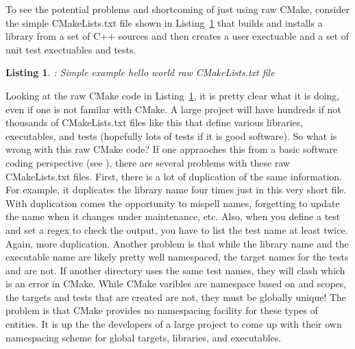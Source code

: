 \documentclass[10pt]{article}
\newtheorem{listing}{Listing}
\begin{document}
To see the potential problems and shortcoming of just using raw CMake, consider the simple CMakeLists.txt file shown in Listing~\ref{listing:RawHelloWorld} that builds and installs a library from a set of C++ sources and then creates a user exectuable and a set of unit test exectuables and tests.

\begin{listing}: Simple example hello world raw CMakeLists.txt file
\label{listing:RawHelloWorld}
{\small

}
\end{listing}

Looking at the raw CMake code in Listing~\ref{listing:RawHelloWorld}, it is pretty clear what it is doing, even if one is not familar with CMake.  A large project will have hundreds if not thousands of CMakeLists.txt files like this that define various libraries, executables, and tests (hopefully lots of tests if it is good software).  So what is wrong with this raw CMake code?  If one appraoches this from a basic software coding perspective (see \cite{CodeComplete2nd04}), there are several problems with these raw CMakeLists.txt files.  First, there is a lot of duplication of the same information.  For example, it duplicates the library name  four times just in this very short file.  With duplication comes the opportunity to mispell names, forgetting to update the name when it changes under maintenance, etc.  Also, when you define a test and set a regex to check the output, you have to list the test name at least twice.  Again, more duplication.  Another problem is that while the library name  and the executable name  are likely pretty well namespaced, the target names for the tests  and  are not.  If another directory uses the same test names, they will clash which is an error in CMake.  While CMake varibles are namespace based on  and  scopes, the targets and tests that are created are not, they must be globally unique!  The problem is that CMake provides no namespacing facility for these types of entities.  It is up the the developers of a large project to come up with their own namespacing scheme for global targets, libraries, and executables.
\end{document}
